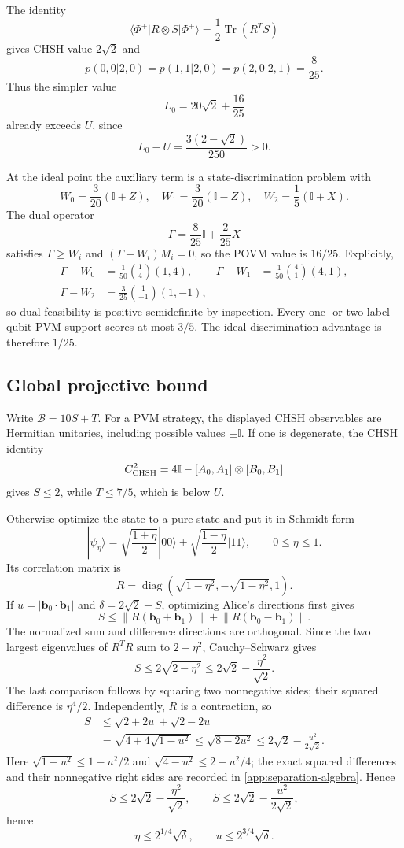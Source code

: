 \documentclass[11pt]{article}
\theoremstyle{definition}
\newcommand{\Tr}{\operatorname{Tr}}
\newcommand{\id}{\mathbb I}
\newcommand{\Bell}{\mathcal B}
\begin{document}
The identity
\[
\langle\Phi^+|R\otimes S|\Phi^+\rangle
=\frac12\Tr(R^TS)
\]
gives CHSH value \(2\sqrt2\) and
\[
p(0,0|2,0)=p(1,1|2,0)=p(2,0|2,1)=\frac8{25}.
\]
Thus the simpler value
\[
L_0=20\sqrt2+\frac{16}{25}
\]
already exceeds \(U\), since
\[
L_0-U=\frac{3(2-\sqrt2)}{250}>0.
\]

At the ideal point the auxiliary term is a state-discrimination problem with
\[
W_0=\frac3{20}(\id+Z),\quad
W_1=\frac3{20}(\id-Z),\quad
W_2=\frac15(\id+X).
\]
The dual operator
\[
\Gamma=\frac8{25}\id+\frac2{25}X
\]
satisfies \(\Gamma\ge W_i\) and
\((\Gamma-W_i)M_i=0\), so the POVM value is \(16/25\).
Explicitly,
\[
\begin{aligned}
\Gamma-W_0&=\frac1{50}\binom14(1,4),&
\Gamma-W_1&=\frac1{50}\binom41(4,1),\\
\Gamma-W_2&=\frac3{25}\binom1{-1}(1,-1),
\end{aligned}
\]
so dual feasibility is positive-semidefinite by inspection.
Every one- or two-label qubit PVM support scores at most \(3/5\). The ideal
discrimination advantage is therefore \(1/25\).

\subsection{Global projective bound}

Write \(\Bell=10S+T\). For a PVM strategy, the displayed CHSH observables are
Hermitian unitaries, including possible values \(\pm\id\). If one is
degenerate, the CHSH identity
\[
C_{\rm CHSH}^2
=4\id-[A_0,A_1]\otimes[B_0,B_1]
\]
gives \(S\le2\), while \(T\le7/5\), which is below \(U\).

Otherwise optimize the state to a pure state and put it in Schmidt form
\[
|\psi_\eta\rangle=
\sqrt{\frac{1+\eta}{2}}|00\rangle+
\sqrt{\frac{1-\eta}{2}}|11\rangle,\qquad0\le\eta\le1.
\]
Its correlation matrix is
\[
R=\operatorname{diag}(\sqrt{1-\eta^2},-\sqrt{1-\eta^2},1).
\]
If \(u=|\bm b_0\cdot\bm b_1|\) and
\(\delta=2\sqrt2-S\), optimizing Alice's directions first gives
\[
S\le
\lVert R(\bm b_0+\bm b_1)\rVert+
\lVert R(\bm b_0-\bm b_1)\rVert.
\]
The normalized sum and difference directions are orthogonal. Since the two
largest eigenvalues of \(R^TR\) sum to \(2-\eta^2\), Cauchy--Schwarz gives
\[
S\le2\sqrt{2-\eta^2}
\le2\sqrt2-\frac{\eta^2}{\sqrt2}.
\]
The last comparison follows by squaring two nonnegative sides; their squared
difference is \(\eta^4/2\). Independently, \(R\) is a contraction, so
\[
\begin{aligned}
S&\le\sqrt{2+2u}+\sqrt{2-2u}\\
&=\sqrt{4+4\sqrt{1-u^2}}
\le\sqrt{8-2u^2}
\le2\sqrt2-\frac{u^2}{2\sqrt2}.
\end{aligned}
\]
Here \(\sqrt{1-u^2}\le1-u^2/2\) and
\(\sqrt{4-u^2}\le2-u^2/4\); the exact squared differences and their
nonnegative right sides are recorded in
\cref{app:separation-algebra}. Hence
\begin{equation}
\label{eq:deficit-bounds}
S\le2\sqrt2-\frac{\eta^2}{\sqrt2},\qquad
S\le2\sqrt2-\frac{u^2}{2\sqrt2},
\end{equation}
hence
\[
\eta\le2^{1/4}\sqrt\delta,\qquad
u\le2^{3/4}\sqrt\delta.
\]
\end{document}
